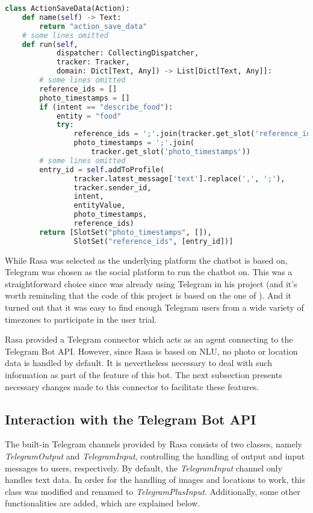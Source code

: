 \bigskip
\begin{lstlisting}[label={action_slot},caption={Getting and setting slots in a custom action to relate entries in persistent data. "photo\_timestamps" and "reference\_ids" are used to find the correct photos to be send to the user in the future\, which help the user to reflect food.},language=Python,captionpos=b]
class ActionSaveData(Action):
    def name(self) -> Text:
        return "action_save_data"
    # some lines omitted
    def run(self,
            dispatcher: CollectingDispatcher,
            tracker: Tracker,
            domain: Dict[Text, Any]) -> List[Dict[Text, Any]]:
        # some lines omitted
        reference_ids = []
        photo_timestamps = []
        if (intent == "describe_food"):
            entity = "food"
            try:
                reference_ids = ';'.join(tracker.get_slot('reference_ids'))
                photo_timestamps = ';'.join(
                    tracker.get_slot('photo_timestamps'))
        # some lines omitted
        entry_id = self.addToProfile(
                tracker.latest_message['text'].replace(',', ';'),
                tracker.sender_id,
                intent,
                entityValue,
                photo_timestamps,
                reference_ids)
        return [SlotSet("photo_timestamps", []),
                SlotSet("reference_ids", [entry_id])]
\end{lstlisting}

\bigskip
While Rasa was selected as the underlying platform the chatbot is based on, Telegram was chosen as the social platform to run the chatbot on. This was a straightforward choice since \citeauthor{17_ludwig} was already using Telegram in his project (and it's worth reminding that the code of this project is based on the one of \citeauthor{17_ludwig}). And it turned out that it was easy to find enough Telegram users from a wide variety of timezones to participate in the user trial.

Rasa provided a Telegram connector which acts as an agent connecting to the Telegram Bot API. However, since Rasa is based on NLU, no photo or location data is handled by default. It is nevertheless necessary to deal with such information as part of the feature of this bot. The next subsection presents necessary changes made to this connector to facilitate these features.

\subsection{Interaction with the Telegram Bot API}
The built-in Telegram channels provided by Rasa consists of two classes, namely \emph{TelegramOutput} and \emph{TelegramInput}, controlling the handling of output and input messages to users, respectively. By default, the \emph{TelegramInput} channel only handles text data. In order for the handling of images and locations to work, this class was modified and renamed to \emph{TelegramPlusInput}. Additionally, some other functionalities are added, which are explained below.

